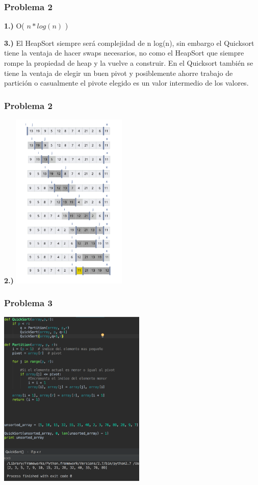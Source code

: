 \documentclass{beamer}
\begin{document}
\begin{frame}
\frametitle{Problema 2}
\textbf{1.)} O( $n * log (n) $ ) \newline


\textbf{3.)}  El HeapSort siempre será complejidad de  n log(n), sin embargo el Quicksort tiene la ventaja de hacer swaps necesarios, no como el HeapSort que siempre rompe la propiedad de heap y la vuelve a construir. En el Quicksort también se tiene la ventaja de elegir un buen pivot y posiblemente ahorre trabajo de partición o casualmente el pivote elegido es un valor intermedio de los valores. 

\end{frame}
\begin{frame}
\frametitle{Problema 2}
\textbf{2.)}      \newline
\includegraphics[width=5.5cm]{partition.jpg}

\end{frame}
\begin{frame}
\frametitle{Problema 3}
\includegraphics[width=7cm]{quick.png}
\end{frame}
\end{document}
